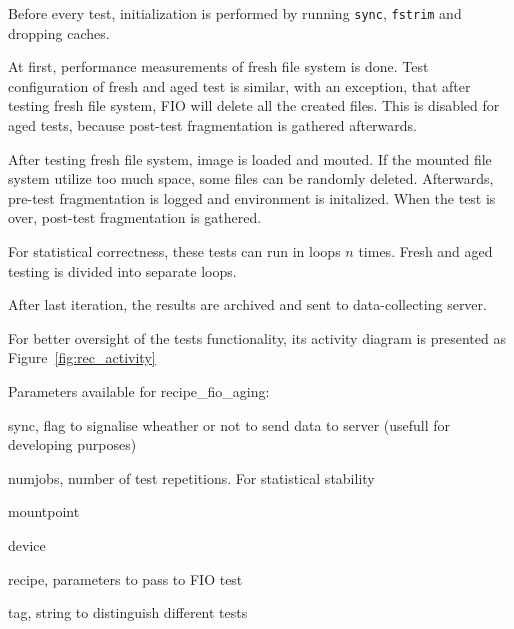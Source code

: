 \documentclass[
  color, %
  table, %
  lof,   %
  lot,   %
]{fithesis3}
\begin{document}
Before every test, initialization is performed by running \texttt{sync}, \texttt{fstrim} and dropping caches.

At first, performance measurements of fresh file system is done. Test configuration of fresh and aged test is similar, with an exception, that after testing fresh file system, FIO will delete all the created files. This is disabled for aged tests, because post-test fragmentation is gathered afterwards.

After testing fresh file system, image is loaded and mouted. If the mounted file system utilize too much space, some files can be randomly deleted. Afterwards, pre-test fragmentation is logged and environment is initalized. When the test is over, post-test fragmentation is gathered.

For statistical correctness, these tests can run in loops $n$ times. Fresh and aged testing is divided into separate loops.

After last iteration, the results are archived and sent to data-collecting server. 

For better oversight of the tests functionality, its activity diagram is presented as Figure~\ref{fig:rec_activity}

Parameters available for recipe\_fio\_aging:
\begin{compactenum}
  \item sync, flag to signalise wheather or not to send data to server (usefull for developing purposes)
  \item numjobs, number of test repetitions. For statistical stability
  \item mountpoint
  \item device
  \item recipe, parameters to pass to FIO test
  \item tag, string to distinguish different tests
  \end{compactenum}
\end{document}
